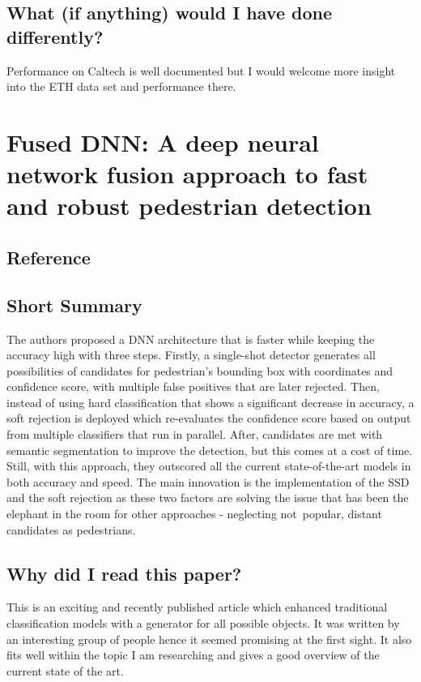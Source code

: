 \documentclass[11pt,a4paper]{article}
\begin{document}
\subsection*{What (if anything) would I have done differently?}
Performance on Caltech is well documented but I would welcome more insight into the ETH data set and performance there.
\newpage 


\section*{Fused DNN: A deep neural network fusion approach to fast and robust pedestrian
detection}
\subsection*{Reference}

\subsection*{Short Summary} 
The authors proposed a DNN architecture that is faster while keeping the accuracy high with three steps. Firstly, a single-shot detector generates all possibilities of candidates for pedestrian’s bounding box with coordinates and confidence score, with multiple false positives that are later rejected. Then, instead of using hard classification that shows a significant decrease in accuracy, a soft rejection is deployed which re-evaluates the confidence score based on output from multiple classifiers that run in parallel. After, candidates are met with semantic segmentation to improve the detection, but this comes at a cost of time. Still, with this approach, they outscored all the current state-of-the-art models in both accuracy and speed. The main innovation is the implementation of the SSD and the soft rejection as these two factors are solving the issue that has been the elephant in the room for other approaches - neglecting not popular, distant candidates as pedestrians.

\subsection*{Why did I read this paper?}
This is an exciting and recently published article which enhanced traditional classification models with a generator for all possible objects. It was written by an interesting group of people hence it seemed promising at the first sight. It also fits well within the topic I am researching and gives a good overview of the current state of the art.
\end{document}
